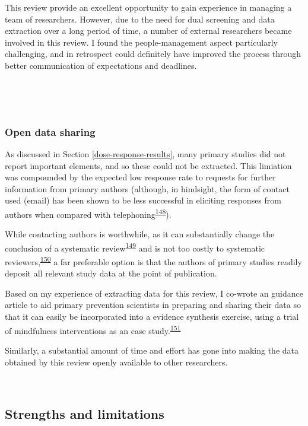 \documentclass[a4paper, twoside]{templates/ociamthesis}
\begin{document}
This review provide an excellent opportunity to gain experience in managing a team of researchers. However, due to the need for dual screening and data extraction over a long period of time, a number of external researchers became involved in this review. I found the people-management aspect particularly challenging, and in retrospect could definitely have improved the process through better communication of expectations and deadlines.

~

~

\hypertarget{sys-rev-open-data}{%
\subsubsection{Open data sharing}\label{sys-rev-open-data}}

As discussed in Section \ref{dose-response-results}, many primary studies did not report important elements, and so these could not be extracted. This limiation was compounded by the expected low response rate to requests for further information from primary authors (although, in hindsight, the form of contact used (email) has been shown to be less successful in eliciting responses from authors when compared with telephoning\textsuperscript{\protect\hyperlink{ref-danko2019}{148}}).

While contacting authors is worthwhile, as it can substantially change the conclusion of a systematic review\textsuperscript{\protect\hyperlink{ref-meursingereynders2019}{149}} and is not too costly to systematic reviewers,\textsuperscript{\protect\hyperlink{ref-cooper2019}{150}} a far preferable option is that the authors of primary studies readily deposit all relevant study data at the point of publication.

Based on my experience of extracting data for this review, I co-wrote an guidance article to aid primary prevention scientists in preparing and sharing their data so that it can easily be incorporated into a evidence synthesis exercise, using a trial of mindfulness interventions as an case study.\textsuperscript{\protect\hyperlink{ref-hennessy2021}{151}}

Similarly, a substantial amount of time and effort has gone into making the data obtained by this review openly available to other researchers.

~

\hypertarget{strengths-and-limitations}{%
\subsection{Strengths and limitations}\label{strengths-and-limitations}}
\end{document}
